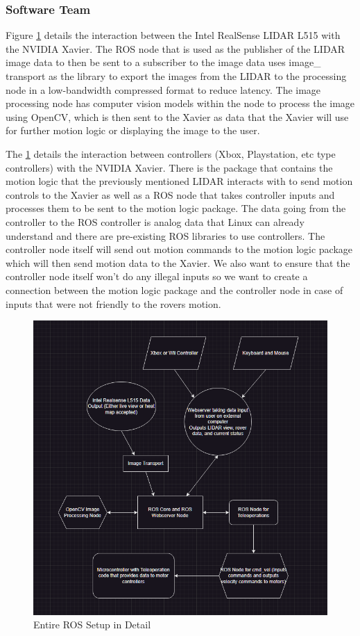 \documentclass[a4paper, 10pt]{article}
\begin{document}
		\subsubsection{Software Team}
		Figure \ref{ros_schema} details the interaction between the Intel RealSense LIDAR L515 with the NVIDIA Xavier. The ROS node that is used as the publisher of the LIDAR image data to then be sent to a subscriber to the image data uses image\_ transport as the library to export the images from the LIDAR to the processing node in a low-bandwidth compressed format to reduce latency. The image processing node has computer vision models within the node to process the image using OpenCV, which is then sent to the Xavier as data that the Xavier will use for further motion logic or displaying the image to the user.
		
		The \ref{ros_schema} details the interaction between controllers (Xbox, Playstation, etc type controllers) with the NVIDIA Xavier. There is the package that contains the motion logic that the previously mentioned LIDAR interacts with to send motion controls to the Xavier as well as a ROS node that takes controller inputs and processes them to be sent to the motion logic package. The data going from the controller to the ROS controller is analog data that Linux can already understand and there are pre-existing ROS libraries to use controllers. The controller node itself will send out motion commands to the motion logic package which will then send motion data to the Xavier. We also want to ensure that the controller node itself won't do any illegal inputs so we want to create a connection between the motion logic package and the controller node in case of inputs that were not friendly to the rovers motion.	

        \begin{figure} [!h]
			\centering
			\includegraphics[scale=0.6]{Photos/Tier2ROS.png}
			\caption{Entire ROS Setup in Detail}
			\label{ros_schema}
		\end{figure}
		
\end{document}
